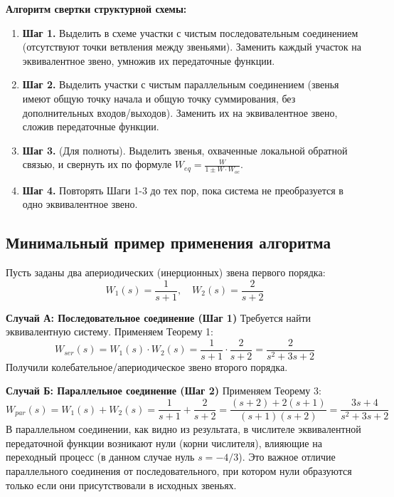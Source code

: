 \documentclass[12pt,a4paper]{article}
\begin{document}
\vspace{0.5cm}
\textbf{Алгоритм свертки структурной схемы:}
\begin{enumerate}
    \item \textbf{Шаг 1.} Выделить в схеме участки с чистым последовательным соединением (отсутствуют точки ветвления между звеньями). Заменить каждый участок на эквивалентное звено, умножив их передаточные функции.
    \item \textbf{Шаг 2.} Выделить участки с чистым параллельным соединением (звенья имеют общую точку начала и общую точку суммирования, без дополнительных входов/выходов). Заменить их на эквивалентное звено, сложив передаточные функции.
    \item \textbf{Шаг 3.} (Для полноты). Выделить звенья, охваченные локальной обратной связью, и свернуть их по формуле $W_{eq} = \frac{W}{1 \pm W \cdot W_{oc}}$.
    \item \textbf{Шаг 4.} Повторять Шаги 1-3 до тех пор, пока система не преобразуется в одно эквивалентное звено.
\end{enumerate}

\subsection{Минимальный пример применения алгоритма}

Пусть заданы два апериодических (инерционных) звена первого порядка:
\begin{equation}
    W_1(s) = \frac{1}{s+1}, \quad W_2(s) = \frac{2}{s+2}
\end{equation}

\textbf{Случай А: Последовательное соединение (Шаг 1)}
Требуется найти эквивалентную систему.
Применяем Теорему 1:
\begin{equation}
    W_{ser}(s) = W_1(s) \cdot W_2(s) = \frac{1}{s+1} \cdot \frac{2}{s+2} = \frac{2}{s^2 + 3s + 2}
\end{equation}
Получили колебательное/апериодическое звено второго порядка.

\textbf{Случай Б: Параллельное соединение (Шаг 2)}
Применяем Теорему 3:
\begin{equation}
    W_{par}(s) = W_1(s) + W_2(s) = \frac{1}{s+1} + \frac{2}{s+2} = \frac{(s+2) + 2(s+1)}{(s+1)(s+2)} = \frac{3s+4}{s^2 + 3s + 2}
\end{equation}
В параллельном соединении, как видно из результата, в числителе эквивалентной передаточной функции возникают нули (корни числителя), влияющие на переходный процесс (в данном случае нуль $s = -4/3$). Это важное отличие параллельного соединения от последовательного, при котором нули образуются только если они присутствовали в исходных звеньях.
\end{document}
